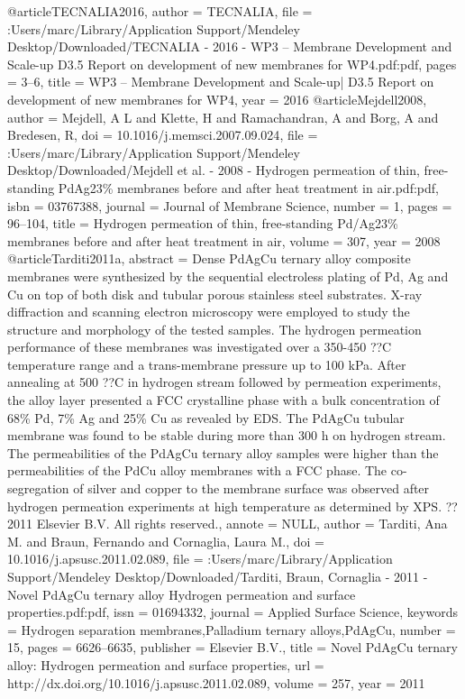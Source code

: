 @article{TECNALIA2016,
author = {TECNALIA},
file = {:Users/marc/Library/Application Support/Mendeley Desktop/Downloaded/TECNALIA - 2016 - WP3 – Membrane Development and Scale-up D3.5 Report on development of new membranes for WP4.pdf:pdf},
pages = {3--6},
title = {{WP3 – Membrane Development and Scale-up| D3.5 Report on development of new membranes for WP4}},
year = {2016}
}
@article{Mejdell2008,
author = {Mejdell, A L and Klette, H and Ramachandran, A and Borg, A and Bredesen, R},
doi = {10.1016/j.memsci.2007.09.024},
file = {:Users/marc/Library/Application Support/Mendeley Desktop/Downloaded/Mejdell et al. - 2008 - Hydrogen permeation of thin, free-standing PdAg23{\%} membranes before and after heat treatment in air.pdf:pdf},
isbn = {03767388},
journal = {Journal of Membrane Science},
number = {1},
pages = {96--104},
title = {{Hydrogen permeation of thin, free-standing Pd/Ag23{\%} membranes before and after heat treatment in air}},
volume = {307},
year = {2008}
}
@article{Tarditi2011a,
abstract = {Dense PdAgCu ternary alloy composite membranes were synthesized by the sequential electroless plating of Pd, Ag and Cu on top of both disk and tubular porous stainless steel substrates. X-ray diffraction and scanning electron microscopy were employed to study the structure and morphology of the tested samples. The hydrogen permeation performance of these membranes was investigated over a 350-450 ??C temperature range and a trans-membrane pressure up to 100 kPa. After annealing at 500 ??C in hydrogen stream followed by permeation experiments, the alloy layer presented a FCC crystalline phase with a bulk concentration of 68{\%} Pd, 7{\%} Ag and 25{\%} Cu as revealed by EDS. The PdAgCu tubular membrane was found to be stable during more than 300 h on hydrogen stream. The permeabilities of the PdAgCu ternary alloy samples were higher than the permeabilities of the PdCu alloy membranes with a FCC phase. The co-segregation of silver and copper to the membrane surface was observed after hydrogen permeation experiments at high temperature as determined by XPS. ?? 2011 Elsevier B.V. All rights reserved.},
annote = {NULL},
author = {Tarditi, Ana M. and Braun, Fernando and Cornaglia, Laura M.},
doi = {10.1016/j.apsusc.2011.02.089},
file = {:Users/marc/Library/Application Support/Mendeley Desktop/Downloaded/Tarditi, Braun, Cornaglia - 2011 - Novel PdAgCu ternary alloy Hydrogen permeation and surface properties.pdf:pdf},
issn = {01694332},
journal = {Applied Surface Science},
keywords = {Hydrogen separation membranes,Palladium ternary alloys,PdAgCu},
number = {15},
pages = {6626--6635},
publisher = {Elsevier B.V.},
title = {{Novel PdAgCu ternary alloy: Hydrogen permeation and surface properties}},
url = {http://dx.doi.org/10.1016/j.apsusc.2011.02.089},
volume = {257},
year = {2011}
}
